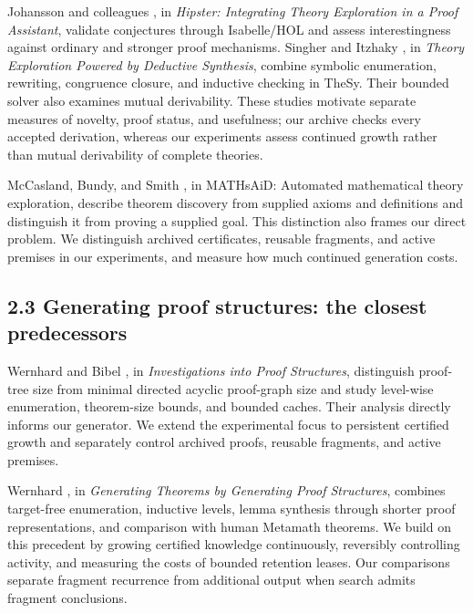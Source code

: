\documentclass[pdflatex,sn-basic,Numbered]{sn-jnl}
\begin{document}
Johansson and colleagues \citep{JohanssonEtAl2014}, in \emph{Hipster: Integrating Theory Exploration in a Proof Assistant}, validate conjectures through Isabelle/HOL and assess interestingness against ordinary and stronger proof mechanisms. Singher and Itzhaky \citep{SingherItzhaky2021}, in \emph{Theory Exploration Powered by Deductive Synthesis}, combine symbolic enumeration, rewriting, congruence closure, and inductive checking in TheSy. Their bounded solver also examines mutual derivability. These studies motivate separate measures of novelty, proof status, and usefulness; our archive checks every accepted derivation, whereas our experiments assess continued growth rather than mutual derivability of complete theories.

McCasland, Bundy, and Smith \citep{McCaslandBundySmith2017}, in MATHsAiD: Automated mathematical theory exploration, describe theorem discovery from supplied axioms and definitions and distinguish it from proving a supplied goal. This distinction also frames our direct problem. We distinguish archived certificates, reusable fragments, and active premises in our experiments, and measure how much continued generation costs.

\subsection*{2.3 Generating proof structures: the closest predecessors}\label{generating-proof-structures-the-closest-predecessors}

Wernhard and Bibel \citep{WernhardBibel2024}, in \emph{Investigations into Proof Structures}, distinguish proof-tree size from minimal directed acyclic proof-graph size and study level-wise enumeration, theorem-size bounds, and bounded caches. Their analysis directly informs our generator. We extend the experimental focus to persistent certified growth and separately control archived proofs, reusable fragments, and active premises.

Wernhard \citep{Wernhard2026}, in \emph{Generating Theorems by Generating Proof Structures}, combines target-free enumeration, inductive levels, lemma synthesis through shorter proof representations, and comparison with human Metamath theorems. We build on this precedent by growing certified knowledge continuously, reversibly controlling activity, and measuring the costs of bounded retention leases. Our comparisons separate fragment recurrence from additional output when search admits fragment conclusions.
\end{document}
